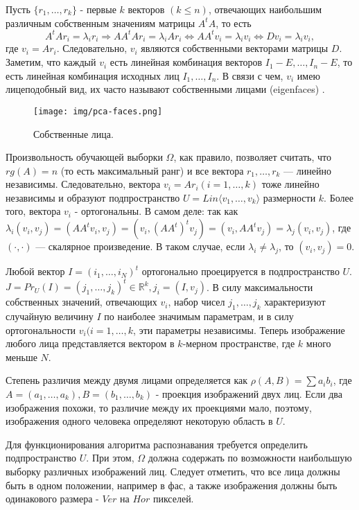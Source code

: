 \documentclass[a4paper,12pt]{report}
\numberwithin{equation}{section}
\begin{document}
Пусть $\{r_1,\dots,r_k\}$ - первые $k$ векторов $(k \leq n)$, отвечающих
наибольшим различным собственным значениям матрицы $A^tA$, то есть
\[ A^tAr_i = \lambda_ir_i \Rightarrow AA^tAr_i = \lambda_iAr_i \Leftrightarrow AA^tv_i = \lambda_iv_i \Leftrightarrow Dv_i = \lambda_iv_i,\]
где $v_i = Ar_i$. Следовательно, $v_i$ являются собственными векторами матрицы
$D$. Заметим, что каждый $v_i$ есть линейная комбинация векторов $I_1 -
E,\dots,I_n - E$, то есть линейная комбинация исходных лиц $I_1,\dots,I_n$. В
связи с чем, $v_i$ имею лицеподобный вид, их часто называют собственными лицами
(eigenfaces) \label{fig:pca-faces}.

\begin{figure}[h!]
  \centering
  \texttt{[image: img/pca-faces.png]}
  \caption{Собственные лица.}
  \label{fig:pca-faces}
\end{figure}

Произвольность обучающей выборки $\Omega$, как правило, позволяет считать, что
$rg(A) = n$ (то есть максимальный ранг) и все вектора $r_1,\dots,r_k$ ---
линейно независимы. Следовательно, вектора $v_i = Ar_i (i = 1,\dots,k)$ тоже
линейно независимы и образуют подпространство $U = Lin\langle
v_1,\dots,v_k\rangle$ размерности $k$. Более того, вектора $v_i$ -
ортогональны. В самом деле: так как $\lambda_i(v_i,v_j) = (AA^tv_i,v_j) =
(v_i,(AA^t)^tv_j) = (v_i, AA^tv_j) = \lambda_j(v_i,v_j)$, где $(\cdot,\cdot)$
--- скалярное произведение. В таком случае, если $\lambda_i \neq \lambda_j$, то
$(v_i,v_j) = 0$.


Любой вектор $I = (i_1,\dots,i_N)^t$ ортогонально проецируется в подпространство
$U$. $J = Pr_U(I) = (j_1,\dots,j_k)^t \in \mathbb{R}^k, j_i = (I,v_j)$. В силу
максимальности собственных значений, отвечающих $v_i$, набор чисел
$j_1,\dots,j_k$ характеризуют случайную величину $I$ по наиболее значимым
параметрам, и в силу ортогональности $v_i (i=1,\dots,k$, эти параметры
независимы. Теперь изображение любого лица представляется вектором в $k$-мерном
пространстве, где $k$ много меньше $N$.


Степень различия между двумя лицами определяется как $\rho(A,B) = \sum a_ib_i$,
где $A = (a_1,\dots,a_k), B = (b_1,\dots,b_k)$ - проекция изображений двух
лиц. Если два изображения похожи, то различие между их проекциями мало, поэтому,
изображения одного человека определяют некоторую область в $U$.


Для функционирования алгоритма распознавания требуется определить
подпространство $U$. При этом, $\Omega$ должна содержать по возможности
наибольшую выборку различных изображений лиц. Следует отметить, что все лица
должны быть в одном положении, например в фас, а также изображения должны быть
одинакового размера - $Ver$ на $Hor$ пикселей.
\end{document}

